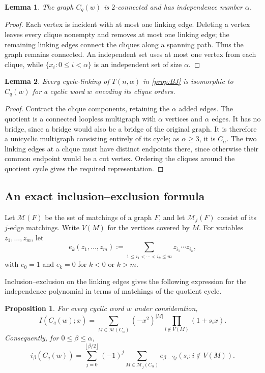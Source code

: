 \documentclass[11pt]{article}
\newtheorem{lemma}[lemma]{Lemma}
\newtheorem{proposition}[proposition]{Proposition}
\theoremstyle{definition}
\newcommand{\cM}{\mathcal{M}}
\newcommand{\floor}[1]{\left\lfloor #1\right\rfloor}
\begin{document}
\begin{lemma}\label{lem:construction-admissible}
The graph $C_q(w)$ is $2$-connected and has independence number
$\alpha$.
\end{lemma}

\begin{proof}
Each vertex is incident with at most one linking edge. Deleting a
vertex leaves every clique nonempty and removes at most one linking
edge; the remaining linking edges connect the cliques along a
spanning path. Thus the graph remains connected. An independent set
uses at most one vertex from each clique, while
$\{x_i:0\le i<\alpha\}$ is an independent set of size $\alpha$.
\end{proof}

\begin{lemma}\label{lem:canonical-cycle}
Every cycle-linking of $T(n,\alpha)$ in \cref{prop:BJ} is isomorphic
to $C_q(w)$ for a cyclic word $w$ encoding its clique orders.
\end{lemma}

\begin{proof}
Contract the clique components, retaining the $\alpha$ added edges.
The quotient is a connected loopless multigraph with $\alpha$
vertices and $\alpha$ edges. It has no bridge, since a bridge would
also be a bridge of the original graph. It is therefore a unicyclic
multigraph consisting entirely of its cycle; as $\alpha\ge3$, it is
$C_\alpha$. The two linking edges at a clique must have distinct
endpoints there, since otherwise their common endpoint would be a
cut vertex. Ordering the cliques around the quotient cycle gives the
required representation.
\end{proof}


\subsection{An exact inclusion--exclusion formula}

Let $\cM(F)$ be the set of matchings of a graph $F$, and let
$\cM_j(F)$ consist of its $j$-edge matchings. Write $V(M)$ for the
vertices covered by $M$. For variables $z_1,\ldots,z_m$, let
\[
 e_k(z_1,\ldots,z_m)
 :=\sum_{1\le i_1<\cdots<i_k\le m}z_{i_1}\cdots z_{i_k},
\]
with $e_0=1$ and $e_k=0$ for $k<0$ or $k>m$.

Inclusion--exclusion on the linking edges gives the following
expression for the independence polynomial in terms of matchings
of the quotient cycle.
\begin{proposition}\label{prop:matching-formula}
For every cyclic word $w$ under consideration,
\begin{equation}\label{eq:matching-polynomial}
 I(C_q(w);x)
 =\sum_{M\in\cM(C_\alpha)}(-x^2)^{|M|}
       \prod_{i\notin V(M)}(1+s_ix).
\end{equation}
Consequently, for $0\le\beta\le\alpha$,
\begin{equation}\label{eq:coefficient-matching}
 i_\beta(C_q(w))
 =\sum_{j=0}^{\floor{\beta/2}}(-1)^j
   \sum_{M\in\cM_j(C_\alpha)}
       e_{\beta-2j}(s_i:i\notin V(M)).
\end{equation}
\end{proposition}
\end{document}
